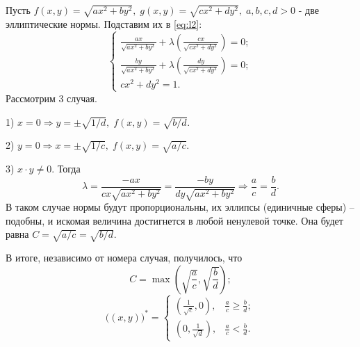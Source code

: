 \documentclass{article}
\begin{document}
Пусть $f(x,y) = \sqrt{ax^2+by^2}, \; g(x,y) = \sqrt{cx^2+dy^2}, \; a,b,c,d > 0$ - две эллиптические нормы. Подставим их в \eqref{eq:l2}:
\begin{equation*}
	\begin{cases}
		\frac{ax}{\sqrt{ax^2+by^2}}+\lambda \left( \frac{cx}{\sqrt{cx^2+dy^2}} \right) = 0; \\
		\frac{by}{\sqrt{ax^2+by^2}}+\lambda \left( \frac{dy}{\sqrt{cx^2+dy^2}} \right) = 0; \\
		cx^2+dy^2 = 1.
	\end{cases}
\end{equation*}
Рассмотрим 3 случая.
\vspace{1mm}

1) $x = 0 \Rightarrow y = \pm\sqrt{1/d}, \; f(x,y) = \sqrt{b/d}. $

2) $y = 0 \Rightarrow x = \pm\sqrt{1/c}, \; f(x,y) = \sqrt{a/c}. $

3) $x \cdot y \neq 0$. Тогда
$$ \lambda = \frac{-ax}{cx\sqrt{ax^2+by^2}} = \frac{-by}{dy\sqrt{ax^2+by^2}} \Rightarrow \frac{a}{c} = \frac{b}{d}. $$ 
В таком случае нормы будут пропорциональны, их эллипсы (единичные сферы) -- подобны, и искомая величина достигнется в любой ненулевой точке. Она будет равна $C = \sqrt{a/c} = \sqrt{b/d}$.

В итоге, независимо от номера случая, получилось, что $$ C = \max\left(\sqrt{\frac{a}{c}}, \sqrt{\frac{b}{d}}\right); $$
\begin{equation*} \big((x,y)\big)^* =
	\begin{cases}
		\left(\frac{1}{\sqrt{c}}, 0\right), & \frac{a}{c} \geq \frac{b}{d}; \\
		\left(0, \frac{1}{\sqrt{d}}\right), & \frac{a}{c} < \frac{b}{d}.
	\end{cases}
\end{equation*}
\vspace{1mm}
\end{document}
